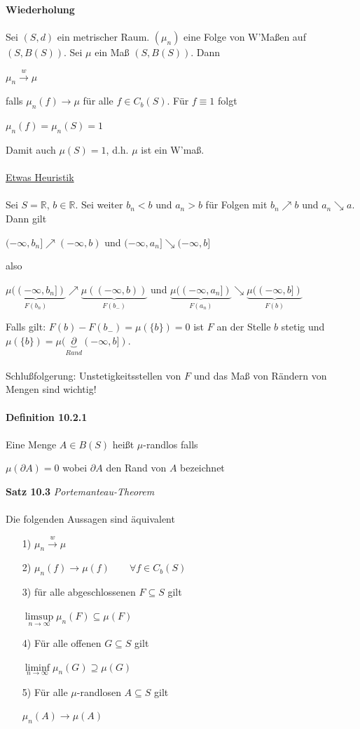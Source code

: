 \documentclass[10pt,a4paper]{report}
\newcommand{\R}{\mathbb{R}}
\numberwithin{equation}{section}
\numberwithin{figure}{section}
\theoremstyle{plain}
\theoremstyle{definition}
\theoremstyle{plain}
\theoremstyle{definition}
\theoremstyle{remark}
\theoremstyle{plain}
\begin{document}
\textbf{Wiederholung}\\\\
Sei $(S,d)$ ein metrischer Raum. $(\mu_n)$ eine Folge von W'Maßen auf $(S,B(S))$. Sei $\mu$ ein Maß $(S,B(S))$. Dann
\begin{center}
$\mu_n \overset{w}{\to} \mu$
\end{center}
falls $\mu_n(f) \to \mu$ für alle $f \in C_b(S)$. Für $f \equiv 1$ folgt
\begin{center}
$\mu_n(f)=\mu_n(S)=1$
\end{center}
Damit auch $\mu(S)=1$, d.h. $\mu$ ist ein W'maß.\\\\
\underline{Etwas Heuristik}\\\\
Sei $S=\R$, $b \in \R$. Sei weiter $b_n <b$ und $a_n>b$ für Folgen mit $b_n\nearrow b$ und $a_n \searrow a$. Dann gilt
\begin{center}
$(-\infty,b_n] \nearrow (-\infty,b)$ und $(-\infty,a_n] \searrow (-\infty,b]$
\end{center}
also 
\begin{center}
$\underbrace{\mu((-\infty,b_n])}_{F(b_n)} \nearrow \underbrace{\mu((-\infty,b))}_{F(b_-)}$ und $\underbrace{\mu((-\infty,a_n])}_{F(a_n)} \searrow \underbrace{\mu((-\infty,b])}_{F(b)}$
\end{center}
Falls gilt: $F(b)-F(b_-)=\mu(\{b\})=0$ ist $F$ an der Stelle $b$ stetig und $\mu(\{b\})=\mu(\underbrace{\partial}_{Rand}(-\infty,b])$.\\\\
Schlußfolgerung: Unstetigkeitsstellen von $F$ und das Maß von Rändern von Mengen sind wichtig!\\\\
\textbf{Definition 10.2.1}\\\\
Eine Menge $A \in B(S)$ heißt $\mu$-randlos falls
\begin{center}
$\mu(\partial A)=0$ wobei $\partial A$ den Rand von $A$ bezeichnet
\end{center}
\textbf{Satz 10.3} \textit{Portemanteau-Theorem}\\\\
Die folgenden Aussagen sind äquivalent
\begin{itemize}
\item[1)] $\mu_n \overset{w}{\to} \mu$
\item[2)] $\mu_n(f) \to \mu(f) \qquad \forall f \in C_b(S)$
\item[3)] für alle abgeschlossenen $F \subseteq S$ gilt
\begin{center}
$\limsup\limits_{n \to \infty} \mu_n(F) \subseteq \mu(F)$
\end{center}  
\item[4)] Für alle offenen $G \subseteq S$ gilt
\begin{center}
$\liminf\limits_{n \to \infty}\mu_n(G) \supseteq \mu(G)$
\end{center}
\item[5)] Für alle $\mu$-randlosen $A \subseteq S$ gilt
\begin{center}
$\mu_n(A) \to \mu(A)$
\end{center}
\end{itemize}
\end{document}
